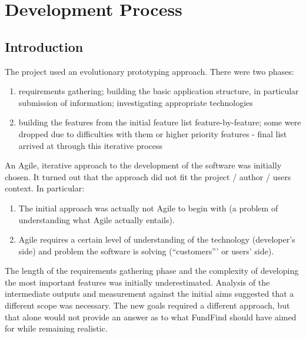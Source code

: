\chapter{Development Process}



\section{Introduction}


The project used an evolutionary prototyping approach. There were two phases:
\begin{enumerate}
 \item requirements gathering; building the basic application structure, in particular submission of information; investigating appropriate technologies
 \item building the features from the initial feature list feature-by-feature; some were dropped due to difficulties with them or higher priority features - final list arrived at through this iterative process
\end{enumerate}

An Agile, iterative approach to the development of the software was initially chosen. It turned out that the approach did not fit the project / author / users context. In particular:

\begin{enumerate}
 \item The initial approach was actually not Agile to begin with (a problem of understanding what Agile actually entails).
 \item Agile requires a certain level of understanding of the technology (developer's side) and problem the software is solving (``customers''' or users' side).
\end{enumerate}

The length of the requirements gathering phase and the complexity of developing the most important features was initially underestimated. Analysis of the intermediate outputs and measurement against the initial aims suggested that a different scope was necessary. The new goals required a different approach, but that alone would not provide an answer as to what FundFind should have aimed for while remaining realistic.

